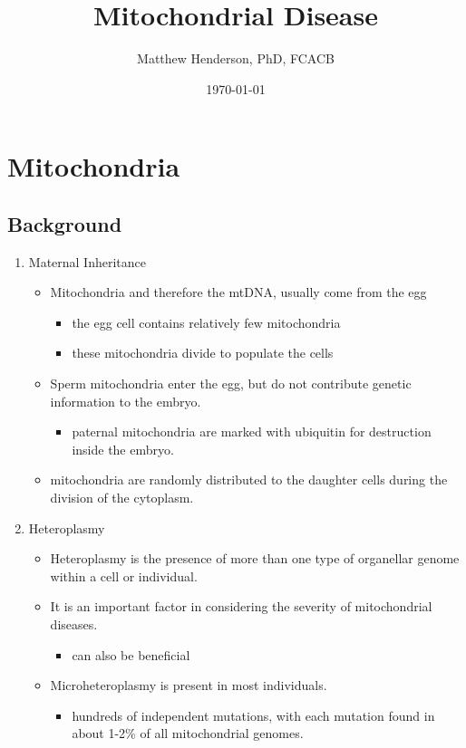 \documentclass{scrartcl}
\author{Matthew Henderson, PhD, FCACB}
\date{\today}
\title{Mitochondrial Disease}
\begin{document}
\maketitle
\tableofcontents


\section{Mitochondria}
\label{sec:org8c7378e}
\subsection{Background}
\label{sec:orgd2b09ab}
\begin{enumerate}
\item Maternal Inheritance
\label{sec:orgd81df7e}
\begin{itemize}
\item Mitochondria and therefore the mtDNA, usually come from the egg
\begin{itemize}
\item the egg cell contains relatively few mitochondria
\item these mitochondria divide to populate the cells
\end{itemize}
\item Sperm mitochondria enter the egg, but do not contribute genetic
information to the embryo.
\begin{itemize}
\item paternal mitochondria are marked with ubiquitin for destruction
inside the embryo.
\end{itemize}
\item mitochondria are randomly distributed to the daughter cells during
the division of the cytoplasm.
\end{itemize}

\item Heteroplasmy
\label{sec:org7f41eb7}

\begin{itemize}
\item Heteroplasmy is the presence of more than one type of organellar
genome within a cell or individual.

\item It is an important factor in considering the severity of
mitochondrial diseases.
\begin{itemize}
\item can also be beneficial
\end{itemize}

\item Microheteroplasmy is present in most individuals.
\begin{itemize}
\item hundreds of independent mutations, with each mutation found in
about 1-2\% of all mitochondrial genomes.
\end{itemize}
\end{itemize}


\end{enumerate}
\end{document}

